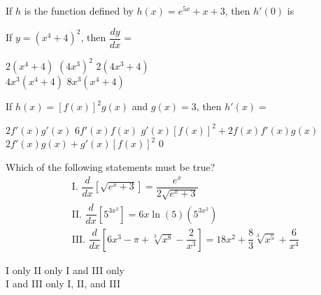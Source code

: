 \documentclass[11pt]{exam}
\newcommand{\horizontalline}{\noindent\makebox[\linewidth]{\rule{\textwidth}{1pt}}}
\newcommand{\diff}{\dfrac{d}{dx}}
\begin{document}
\begin{questions}
    \question If $h$ is the function defined by $h(x) = e^{5x} + x + 3$, then $h'(0) $ is \\

    \begin{oneparchoices}
    \end{oneparchoices} \par \horizontalline

    \question If $y = \left(x^4 + 4\right)^2$, then $\dfrac{dy}{dx} = $ \\

    \begin{oneparchoices}
        \choice $2\left(x^4 + 4\right)$
        \choice $\left(4x^3\right)^2$
        \choice $2\left(4x^3 + 4\right)$ \\[11pt]
        \makebox[0.23 \textwidth] \choice $4x^3\left(x^4 + 4\right)$
        \makebox[0.25 \textwidth] \choice $8x^3\left(x^4 + 4\right)$
    \end{oneparchoices} \par \horizontalline

    \question If $h(x) = \left[f(x)\right]^2 g(x)$ and $g(x) = 3$, then $h'(x) = $ \\

    \begin{oneparchoices}
        \choice $2f'(x)g'(x)$
        \choice $6f'(x)f(x)$
        \choice $g'(x)\left[f(x)\right]^2 + 2f(x)f'(x)g(x)$ \\[11pt]
        \makebox[0.23 \textwidth] \choice $2f'(x)g(x) + g'(x)\left[f(x)\right]^2$
        \makebox[0.25 \textwidth] \choice $0$
    \end{oneparchoices} \par \horizontalline

    \question Which of the following statements must be true?
    \begin{align*}
        & \text{I. } \diff \left[\sqrt{e^x + 3}\right] = \dfrac{e^x}{2\sqrt{e^x + 3}} \\[11pt]
        & \text{II. } \diff\left[5^{3x^2}\right] = 6x\ln (5)\left(5^{3x^2}\right) \\[11pt]
        & \text{III. } \diff\left[6x^3 - \pi + \sqrt[3]{x^8} - \dfrac{2}{x^3}\right] = 18x^2 + \dfrac{8}{3}\sqrt[3]{x^5} + \dfrac{6}{x^4}
    \end{align*}

    \begin{oneparchoices}
        \choice I only 
        \choice II only 
        \choice I and III only \\[11pt]
        \makebox[0.2 \textwidth] \choice I and III only 
        \makebox[0.25 \textwidth] \choice I, II, and III
    \end{oneparchoices} \par \horizontalline
\end{questions} 
\end{document}
